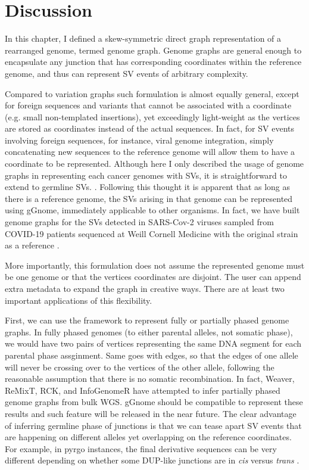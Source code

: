 \documentclass[phd,tocprelim]{cornell}
\begin{document}
\section{Discussion}
In this chapter, I defined a skew-symmetric direct graph representation of a rearranged genome, termed genome graph. Genome graphs are general enough to encapsulate any junction that has corresponding coordinates within the reference genome, and thus can represent SV events of arbitrary complexity. 

Compared to variation graphs \cite{Hickey2020-cu} such formulation is almost equally general, except for foreign sequences and variants that cannot be associated with a coordinate (e.g. small non-templated insertions), yet exceedingly light-weight as the vertices are stored as coordinates instead of the actual sequences. In fact, for SV events involving foreign sequences, for instance, viral genome integration, simply concatenating new sequences to the reference genome will allow them to have a coordinate to be represented. Although here I only described the usage of genome graphs in representing each cancer genomes with SVs, it is straightforward to extend to germline SVs. \cite{Siren2020-tf,Eizenga2020-cf}. Following this thought it is apparent that as long as there is a reference genome, the SVs arising in that genome can be represented using gGnome, immediately applicable to other organisms. In fact, we have built genome graphs for the SVs detected in SARS-Cov-2 viruses sampled from COVID-19 patients sequenced at Weill Cornell Medicine with the original strain as a reference \cite{Butler2021-mp}.

More importantly, this formulation does not assume the represented genome must be one genome or that the vertices coordinates are disjoint. The user can append extra metadata to expand the graph in creative ways. There are at least two important applications of this flexibility.

First, we can use the framework to represent fully or partially phased genome graphs. In fully phased genomes (to either parental alleles, not somatic phase), we would have two pairs of vertices representing the same DNA segment for each parental phase assginment. Same goes with edges, so that the edges of one allele will never be crossing over to the vertices of the other allele, following the reasonable assumption that there is no somatic recombination. In fact, Weaver, ReMixT, RCK, and InfoGenomeR have attempted to infer partially phased genome graphs from bulk WGS. gGnome should be compatible to represent these results and such feature will be released in the near future. The clear advantage of inferring germline phase of junctions is that we can tease apart SV events that are happening on different alleles yet overlapping on the reference coordinates. For example, in pyrgo instances, the final derivative sequences can be very different depending on whether some DUP-like junctions are in \textit{cis} versus \textit{trans} \cite{Hadi2020-um}.
\end{document}
